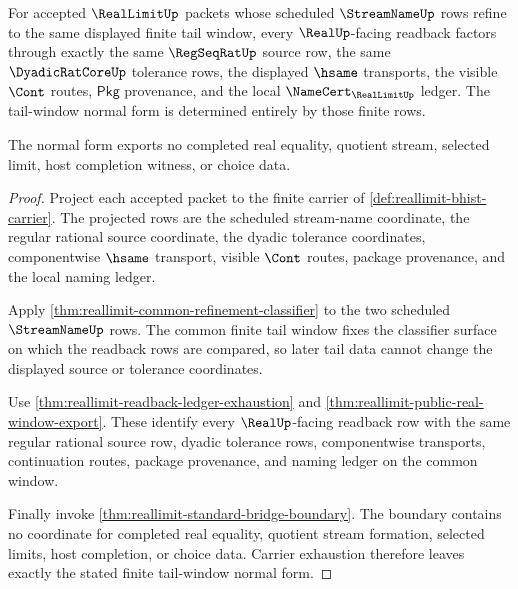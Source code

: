 \begin{theorem}
\label{thm:reallimit-stream-tail-window-normal-form}
For accepted $\RealLimitUp$ packets whose scheduled $\StreamNameUp$ rows refine
to the same displayed finite tail window, every $\RealUp$-facing readback
factors through exactly the same $\RegSeqRatUp$ source row, the same
$\DyadicRatCoreUp$ tolerance rows, the displayed $\hsame$ transports, the
visible $\Cont$ routes, $\mathsf{Pkg}$ provenance, and the local
$\NameCert_{\RealLimitUp}$ ledger. The tail-window normal form is determined
entirely by those finite rows.

The normal form exports no completed real equality, quotient stream, selected
limit, host completion witness, or choice data.
\end{theorem}
\begin{proof}
Project each accepted packet to the finite carrier of
\autoref{def:reallimit-bhist-carrier}. The projected rows are the scheduled
stream-name coordinate, the regular rational source coordinate, the dyadic
tolerance coordinates, componentwise $\hsame$ transport, visible $\Cont$
routes, package provenance, and the local naming ledger.

Apply \autoref{thm:reallimit-common-refinement-classifier} to the two scheduled
$\StreamNameUp$ rows. The common finite tail window fixes the classifier
surface on which the readback rows are compared, so later tail data cannot
change the displayed source or tolerance coordinates.

Use \autoref{thm:reallimit-readback-ledger-exhaustion} and
\autoref{thm:reallimit-public-real-window-export}. These identify every
$\RealUp$-facing readback row with the same regular rational source row,
dyadic tolerance rows, componentwise transports, continuation routes, package
provenance, and naming ledger on the common window.

Finally invoke \autoref{thm:reallimit-standard-bridge-boundary}. The boundary
contains no coordinate for completed real equality, quotient stream formation,
selected limits, host completion, or choice data. Carrier exhaustion therefore
leaves exactly the stated finite tail-window normal form.
\end{proof}

